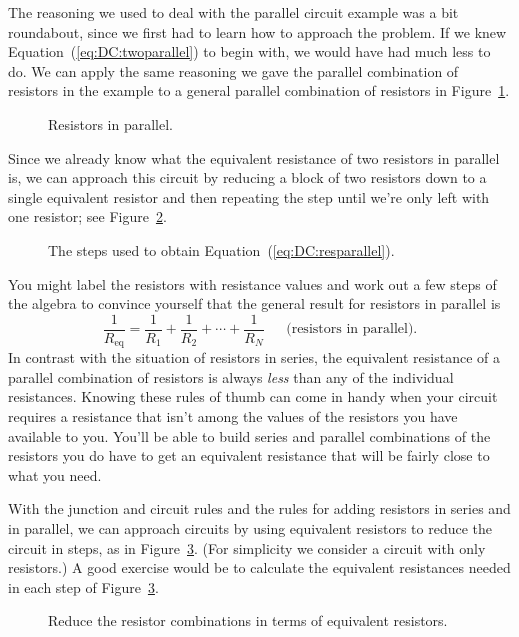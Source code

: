 The reasoning we used to deal with the parallel circuit example was a bit
roundabout, since we first had to learn how to approach the problem.  If we 
knew Equation~(\ref{eq:DC:twoparallel}) to begin with, we would have had much 
less to do. We can apply the same reasoning we gave the parallel combination 
of resistors in the example to a general parallel combination of resistors in
Figure~\ref{fig:DC:resistpar}.
\begin{figure}[htb]
\centerline{\epsfxsize=10cm }
\caption{Resistors in parallel.}
\label{fig:DC:resistpar}
\end{figure}
Since we already know what the equivalent resistance of two resistors in 
parallel is, we can approach this circuit by reducing a block of two resistors
down to a single equivalent resistor and then repeating the step until we're 
only left with one resistor; see Figure~\ref{fig:DC:parallelred}.
\begin{figure}[htb]
\centerline{\epsfxsize=14cm }
\caption{The steps used to obtain Equation~(\ref{eq:DC:resparallel}).}
\label{fig:DC:parallelred}
\end{figure}
You might label the resistors with resistance values and work out a few steps 
of the algebra to convince yourself that the general result for resistors in 
parallel is 
\begin{equation}
\frac{1}{R_{\mbox{eq}}} = \frac{1}{R_1} + \frac{1}{R_2}+\cdots +\frac{1}{R_N}
~~~~~~~\mbox{(resistors in parallel)}.  \label{eq:DC:resparallel}
\end{equation}
In contrast with the situation of resistors in series, the equivalent 
resistance of a parallel combination of resistors is always {\it less} than
any of the individual resistances.  Knowing these rules of thumb can come in 
handy when your circuit requires a resistance that isn't among the values
of the resistors you have available to you.  You'll be able to build series and
parallel combinations of the resistors you do have to get an equivalent 
resistance that will be fairly close to what you need.


With the junction and circuit rules and the rules for adding resistors in 
series and in parallel, we can approach circuits by using equivalent resistors 
to reduce the circuit in steps, as in Figure~\ref{fig:DC:resistreduce}. (For 
simplicity we consider a circuit with only resistors.)  
A good exercise would be to calculate the equivalent resistances needed in each
step of Figure~\ref{fig:DC:resistreduce}.  
\begin{figure}[htb]
\centerline{\epsfxsize=9cm }
\caption{Reduce the resistor combinations in terms of equivalent resistors.}
\label{fig:DC:resistreduce}
\end{figure}

